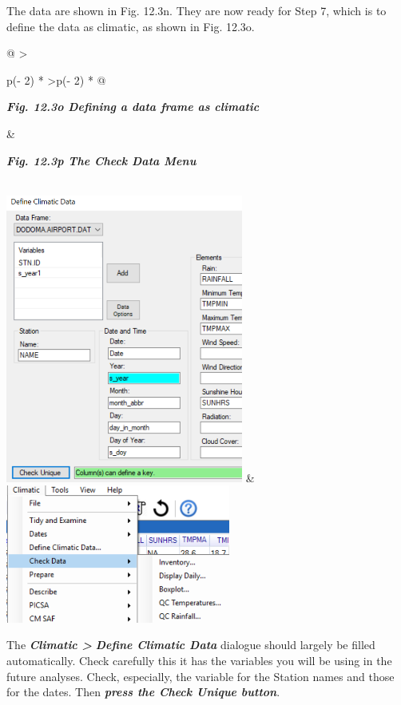 \documentclass[
  letterpaper,
  DIV=11,
  numbers=noendperiod]{scrreprt}
\begin{document}
The data are shown in Fig. 12.3n. They are now ready for Step 7, which
is to define the data as climatic, as shown in Fig. 12.3o.

\begin{longtable}[]{@{}
  >{\raggedright\arraybackslash}p{(\columnwidth - 2\tabcolsep) * }
  >{\raggedleft\arraybackslash}p{(\columnwidth - 2\tabcolsep) * }@{}}
\toprule\noalign{}
\begin{minipage}[b]{\linewidth}\raggedright
\textbf{\emph{Fig. 12.3o Defining a data frame as climatic}}
\end{minipage} & \begin{minipage}[b]{\linewidth}\raggedleft
\textbf{\emph{Fig. 12.3p The Check Data Menu}}
\end{minipage} \\
\midrule\noalign{}
\endhead
\bottomrule\noalign{}
\endlastfoot
\includegraphics[width=3.0738in,height=3.73997in]{figures/Fig12.3o.png}
&
\includegraphics[width=2.90932in,height=1.78502in]{figures/Fig12.3p.png} \\
\end{longtable}

The \textbf{\emph{Climatic \textgreater{}}} \textbf{\emph{Define
Climatic Data}} dialogue should largely be filled automatically. Check
carefully this it has the variables you will be using in the future
analyses. Check, especially, the variable for the Station names and
those for the dates. Then \textbf{\emph{press the Check Unique button}}.
\end{document}
